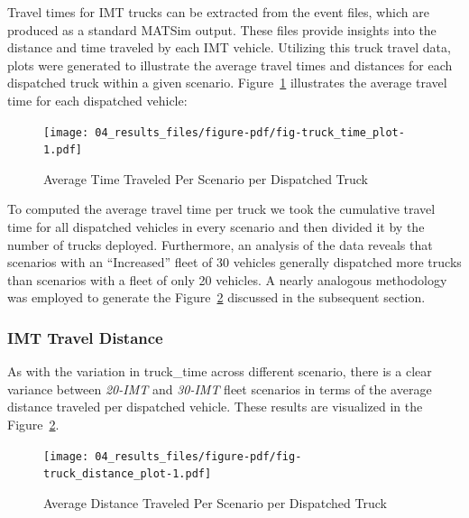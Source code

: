 \documentclass[
  letterpaper,
  authoryear]{elsarticle}
\begin{document}
Travel times for IMT trucks can be extracted from the event files, which
are produced as a standard MATSim output. These files provide insights
into the distance and time traveled by each IMT vehicle. Utilizing this
truck travel data, plots were generated to illustrate the average travel
times and distances for each dispatched truck within a given scenario.
Figure~\ref{fig-truck_time_plot} illustrates the average travel time for
each dispatched vehicle:

\begin{figure}

{\centering \texttt{[image: 04\_results\_files/figure-pdf/fig-truck\_time\_plot-1.pdf]}

}

\caption{\label{fig-truck_time_plot}Average Time Traveled Per Scenario
per Dispatched Truck}

\end{figure}

To computed the average travel time per truck we took the cumulative
travel time for all dispatched vehicles in every scenario and then
divided it by the number of trucks deployed. Furthermore, an analysis of
the \citet{truck_csv} data reveals that scenarios with an ``Increased''
fleet of 30 vehicles generally dispatched more trucks than scenarios
with a fleet of only 20 vehicles. A nearly analogous methodology was
employed to generate the Figure~\ref{fig-truck_distance_plot} discussed
in the subsequent section.

\hypertarget{imt-travel-distance}{%
\subsubsection{IMT Travel Distance}\label{imt-travel-distance}}

As with the variation in truck\_time across different scenario, there is
a clear variance between \emph{20-IMT} and \emph{30-IMT} fleet scenarios
in terms of the average distance traveled per dispatched vehicle. These
results are visualized in the Figure~\ref{fig-truck_distance_plot}.

\begin{figure}

{\centering \texttt{[image: 04\_results\_files/figure-pdf/fig-truck\_distance\_plot-1.pdf]}

}

\caption{\label{fig-truck_distance_plot}Average Distance Traveled Per
Scenario per Dispatched Truck}

\end{figure}
\end{document}
